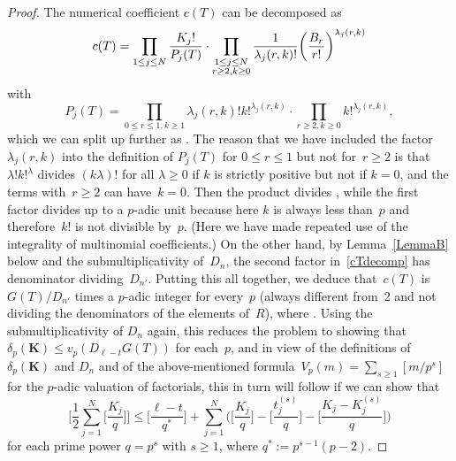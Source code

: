 \documentclass[11pt]{article}
\numberwithin{equation}{section}
\numberwithin{equation}{section}
\def\l{\lambda}
\def\l{\lambda}
\def\m{ - }
\def\l{\lambda}
\def\be{\begin{equation}}
\def\ee{\end{equation}}
\def\bK{\mathbf K}
\begin{document}
\begin{proof}
The numerical coefficient $c(T)$ can be decomposed as
\be
\label{cTdecomp}
c(T) = \prod_{1\le j\le N}\frac{K_j!}{P_j(T)} \cdot
\prod_{\substack{1\le j\le N \\ r\ge2, k\ge0\substack}}
\frac1{\l_j(r,k)!} \biggl(\frac{B_r}{r!}\biggr)^{\l_j(r,k)}
\ee
with
\[
P_j(T) = \prod_{0\le r\le1, k\ge1}\l_j(r,k)! k!^{\l_j(r,k)} \cdot
\prod_{r\ge2, k\ge0}k!^{\l_j(r,k)} ,
\]
which we can split up further as .
The reason that we have included the factor $\l_j(r,k)$ into the definition of
$P_j(T)$ for $0\le r\le1$ but not for~$r\ge2$ is that~$\l!k!^\l$ divides $(k\l)!$
for all $\l\ge0$ if $k$ is strictly positive but not if $k=0$, and the terms with~${r\ge2}$ can have~$k=0$. Then the product 
divides , while the first factor  divides 
up to a $p$-adic unit because here $k$ is always less than~$p$ and therefore~$k!$
is not divisible by~$p$. (Here we have made repeated use of the integrality of
multinomial coefficients.) On the other hand, by Lemma~\ref{LemmaB} below
and the submultiplicativity of~$D_n$, the second factor in~\eqref{cTdecomp} has
denominator dividing~$D_{n'}$. Putting this all together, we deduce that~$c(T)$
is $G(T)/D_{n'}$ times a $p$-adic integer for every~$p$ (always different from~2
and not dividing the denominators of the elements of~$R$), where
. Using the
submultiplicativity of $D_n$ again, this reduces the problem to showing that
${\delta_p(\bK)\le v_p(D_{\ell-t} G(T))}$ for each~$p$, and in view of
the definitions of $\delta_p(\bK)$ and $D_n$ and of the above-mentioned formula~${V_p(m)=\sum_{s\ge1}[m/p^s]}$ for the $p$-adic valuation of factorials, this in turn
will follow if we can show that
\be
\label{Final}
\Biggl[\frac12\sum_{j=1}^N\biggl[\frac{K_j}q\biggr]\Biggr] \le
\biggl[\frac{\ell-t}{q^*}\biggr]
+ \sum_{j=1}^N \Bigg(\biggl[\frac{K_j}q\biggr] \m \Bigg[\frac{t_j^{(s)}}q\Bigg]
\m \Bigg[\frac{K_j-K_j^{(s)}}q\Bigg] \Bigg)
\ee
for each prime power $q=p^s$ with $s\ge1$, where $q^*:=p^{s-1}(p-2)$. %


\end{proof}
\end{document}

